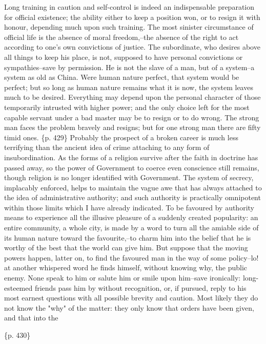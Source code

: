 Long training in caution and self-control is indeed an indispensable preparation for official existence; the ability either to keep a position won, or to resign it with honour, depending much upon such training. The most sinister circumstance of official life is the absence of moral freedom,--the absence of the right to act according to one's own convictions of justice. The subordinate, who desires above all things to keep his place, is not, supposed to have personal convictions or sympathies--save by permission. He is not the slave of a man, but of a system--a system as old as China. Were human nature perfect, that system would be perfect; but so long as human nature remains what it is now, the system leaves much to be desired. Everything may depend upon the personal character of those temporarily intrusted with higher power; and the only choice left for the most capable servant under a bad master may be to resign or to do wrong. The strong man faces the problem bravely and resigns; but for one strong man there are fifty timid ones. \{p. 429\} Probably the prospect of a broken career is much less terrifying than the ancient idea of crime attaching to any form of insubordination. As the forms of a religion survive after the faith in doctrine has passed away, so the power of Government to coerce even conscience still remains, though religion is no longer identified with Government. The system of secrecy, implacably enforced, helps to maintain the vague awe that has always attached to the idea of administrative authority; and such authority is practically omnipotent within those limits which I have already indicated. To be favoured by authority means to experience all the illusive pleasure of a suddenly created popularity: an entire community, a whole city, is made by a word to turn all the amiable side of its human nature toward the favourite,--to charm him into the belief that he is worthy of the best that the world can give him. But suppose that the moving powers happen, latter on, to find the favoured man in the way of some policy--lo! at another whispered word he finds himself, without knowing why, the public enemy. None speak to him or salute him or smile upon him--save ironically: long-esteemed friends pass him by without recognition, or, if pursued, reply to his most earnest questions with all possible brevity and caution. Most likely they do not know the "why" of the matter: they only know that orders have been given, and that into the

\{p. 430\}

